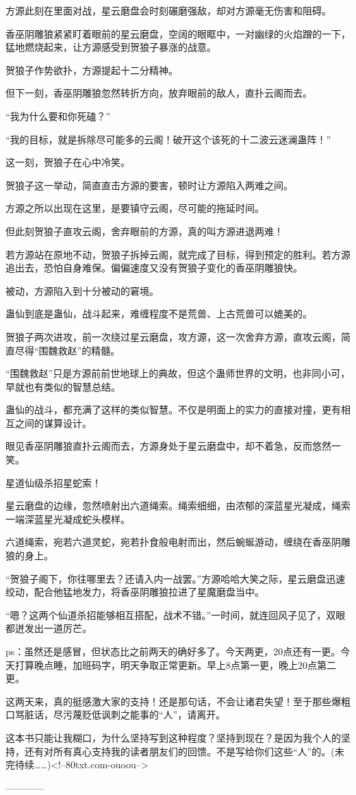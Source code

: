 \begin{this_body}
方源此刻在里面对战，星云磨盘会时刻碾磨强敌，却对方源毫无伤害和阻碍。

香巫阴雕狼紧紧盯着眼前的星云磨盘，空阔的眼眶中，一对幽绿的火焰蹭的一下，猛地燃烧起来，让方源感受到贺狼子暴涨的战意。

贺狼子作势欲扑，方源提起十二分精神。

但下一刻，香巫阴雕狼忽然转折方向，放弃眼前的敌人，直扑云阁而去。

“我为什么要和你死磕？”

“我的目标，就是拆除尽可能多的云阁！破开这个该死的十二波云迷澜蛊阵！”

这一刻，贺狼子在心中冷笑。

贺狼子这一举动，简直直击方源的要害，顿时让方源陷入两难之间。

方源之所以出现在这里，是要镇守云阁，尽可能的拖延时间。

但此刻贺狼子直攻云阁，舍弃眼前的方源，真的叫方源进退两难！

若方源站在原地不动，贺狼子拆掉云阁，就完成了目标，得到预定的胜利。若方源追出去，恐怕自身难保。偏偏速度又没有贺狼子变化的香巫阴雕狼快。

被动，方源陷入到十分被动的窘境。

蛊仙到底是蛊仙，战斗起来，难缠程度不是荒兽、上古荒兽可以媲美的。

贺狼子两次进攻，前一次绕过星云磨盘，攻方源，这一次舍弃方源，直攻云阁，简直尽得“围魏救赵”的精髓。

“围魏救赵”只是方源前前世地球上的典故，但这个蛊师世界的文明，也非同小可，早就也有类似的智慧总结。

蛊仙的战斗，都充满了这样的类似智慧。不仅是明面上的实力的直接对撞，更有相互之间的谋算设计。

眼见香巫阴雕狼直扑云阁而去，方源身处于星云磨盘中，却不着急，反而悠然一笑。

星道仙级杀招星蛇索！

星云磨盘的边缘，忽然喷射出六道绳索。绳索细细，由浓郁的深蓝星光凝成，绳索一端深蓝星光凝成蛇头模样。

六道绳索，宛若六道灵蛇，宛若扑食般电射而出，然后蜿蜒游动，缠绕在香巫阴雕狼的身上。

“贺狼子阁下，你往哪里去？还请入内一战罢。”方源哈哈大笑之际，星云磨盘迅速绞动，配合他猛地发力，将香巫阴雕狼拉进了星魔磨盘当中。

“嗯？这两个仙道杀招能够相互搭配，战术不错。”一时间，就连回风子见了，双眼都迸发出一道厉芒。

ps：虽然还是感冒，但状态比之前两天的确好多了。今天两更，20点还有一更。今天打算晚点睡，加班码字，明天争取正常更新。早上8点第一更，晚上20点第二更。

这两天来，真的挺感激大家的支持！还是那句话，不会让诸君失望！至于那些爆粗口骂脏话，尽污蔑贬低讽刺之能事的“人”，请离开。

这本书只能让我糊口，为什么坚持写到这种程度？坚持到现在？是因为我个人的坚持，还有对所有真心支持我的读者朋友们的回馈。不是写给你们这些“人”的。(未完待续……)<!--80txt.com-ouoou-->

------------

\end{this_body}

